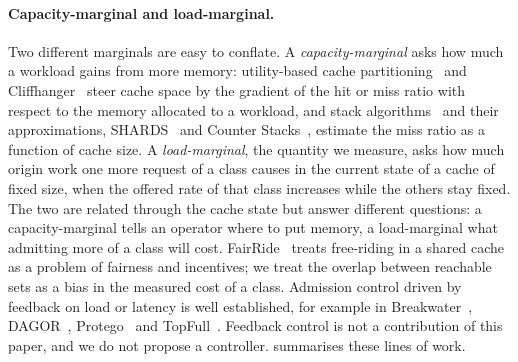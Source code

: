 \paragraph{Capacity-marginal and load-marginal.}
Two different marginals are easy to conflate.
A \emph{capacity-marginal} asks how much a workload gains from more memory: utility-based
cache partitioning~\cite{qureshi2006ucp} and Cliffhanger~\cite{cidon2016cliffhanger} steer
cache space by the gradient of the hit or miss ratio with respect to the memory allocated
to a workload, and stack algorithms~\cite{mattson1970} and their approximations,
SHARDS~\cite{waldspurger2015shards} and Counter Stacks~\cite{wires2014counterstacks},
estimate the miss ratio as a function of cache size.
A \emph{load-marginal}, the quantity we measure, asks how much origin work one more
request of a class causes in the current state of a cache of fixed size, when the offered
rate of that class increases while the others stay fixed.
The two are related through the cache state but answer different questions: a
capacity-marginal tells an operator where to put memory, a load-marginal what admitting
more of a class will cost.
FairRide~\cite{pu2016fairride} treats free-riding in a shared cache as a problem of
fairness and incentives; we treat the overlap between reachable sets as a bias in the
measured cost of a class.
Admission control driven by feedback on load or latency is well established, for example
in Breakwater~\cite{cho2020breakwater}, DAGOR~\cite{zhou2018dagor},
Protego~\cite{cho2023protego} and TopFull~\cite{park2024topfull}.
Feedback control is not a contribution of this paper, and we do not propose a controller.
 summarises these lines of work.

